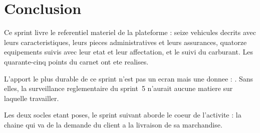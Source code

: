 \section*{Conclusion}

Ce sprint livre le referentiel materiel de la plateforme : seize
vehicules decrits avec leurs caracteristiques, leurs pieces
administratives et leurs assurances, quatorze equipements suivis avec
leur etat et leur affectation, et le suivi du carburant. Les
quarante-cinq points du carnet ont ete realises.

L'apport le plus durable de ce sprint n'est pas un ecran mais une
donnee : . Sans elles, la surveillance reglementaire du sprint~5
n'aurait aucune matiere sur laquelle travailler.

Les deux socles etant poses, le sprint suivant aborde le coeur de
l'activite : la chaine qui va de la demande du client a la livraison de
sa marchandise.
